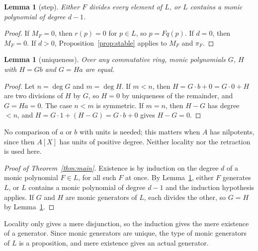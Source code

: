 \documentclass[11pt]{amsart}
\newtheorem{lemma}[theorem]{Lemma}
\theoremstyle{remark}
\begin{document}
\begin{lemma}[step]\label{lem:step}
Either $F$ divides every element of $L$, or $L$ contains a monic polynomial
of degree $d-1$.
\end{lemma}

\begin{proof}
If $M_F=0$, then $r(p)=0$ for $p\in L$, so $p=Fq(p)$. If $d=0$, then
$M_F=0$. If $d>0$, Proposition~\ref{prop:stable} applies to $M_F$ and
$\pi_F$.
\end{proof}

\begin{lemma}[uniqueness]\label{lem:unique}
Over any commutative ring, monic polynomials $G$, $H$ with $H=Gb$ and
$G=Ha$ are equal.
\end{lemma}

\begin{proof}
Let $n=\deg G$ and $m=\deg H$. If $m<n$, then $H=G\cdot b+0=G\cdot 0+H$
are two divisions of $H$ by $G$, so $H=0$ by uniqueness of the remainder,
and $G=Ha=0$. The case $n<m$ is symmetric. If $m=n$, then $H-G$ has degree
$<n$, and $H=G\cdot 1+(H-G)=G\cdot b+0$ gives $H-G=0$.
\end{proof}

No comparison of $a$ or $b$ with units is needed; this matters when $A$ has
nilpotents, since then $A[X]$ has units of positive degree. Neither
locality nor the retraction is used here.

\begin{proof}[Proof of Theorem~\ref{thm:main}]
Existence is by induction on the degree $d$ of a monic polynomial $F\in L$,
for all such $F$ at once. By Lemma~\ref{lem:step}, either $F$ generates $L$,
or $L$ contains a monic polynomial of degree $d-1$ and the induction
hypothesis applies. If $G$ and $H$ are monic generators of $L$, each
divides the other, so $G=H$ by Lemma~\ref{lem:unique}.
\end{proof}

Locality only gives a mere disjunction, so the induction gives the mere
existence of a generator. Since monic generators are unique, the type of
monic generators of $L$ is a proposition, and mere existence gives an actual
generator.
\end{document}
